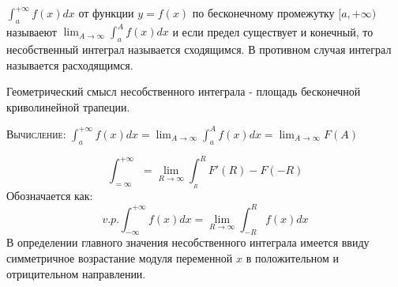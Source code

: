     \begin{definition}
        $\int_{a}^{+\infty} f(x) dx$ от функции $y=f(x)$ по бесконечному промежутку $[a, +\infty)$ называеют $\lim_{A\rightarrow\infty} \int^A_a f(x)dx$ и если предел существует и конечный, то несобственный интеграл называется сходящимся. В противном случая интеграл называется расходящимся. 

        Геометрический смысл несобственного интеграла - площадь бесконечной криволинейной трапеции.

        \textsc{Вычисление:} $\int^{+\infty}_a f(x)dx = \lim_{A\rightarrow \infty} \int^A_a f(x)dx = \lim_{A\rightarrow \infty} F(A)$
    \end{definition}

    \begin{definition}
        $$\int_{=\infty}^{+\infty} = \lim_{R\rightarrow \infty} \int_{_R}^{R} F'(R) - F(-R)$$
        Обозначается как: $$v.p. \int_{-\infty}^{+\infty} f(x) dx = \lim_{R \rightarrow \infty} \int^R_{-R} f(x) dx$$
        В определении главного значения несобственного интеграла имеется ввиду симметричное возрастание модуля переменной $x$ в положительном и отрицительном направлении. 
    \end{definition}